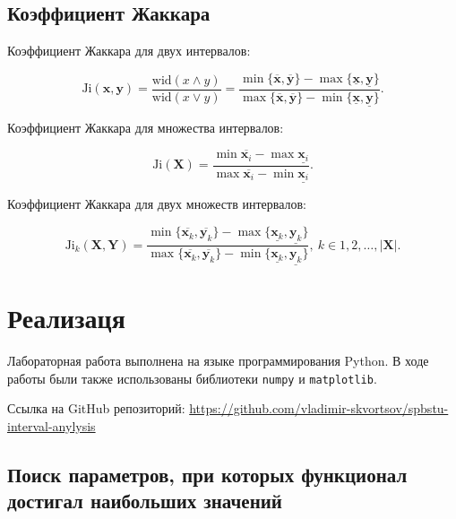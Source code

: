 \documentclass{article}
\begin{document}
  \subsection{Коэффициент Жаккара}

  Коэффициент Жаккара для двух интервалов:

  \begin{equation}
    \text{Ji} (\mathbf{x}, \mathbf{y})
      = \frac{\text{wid} (x \land y)}{\text{wid} (x \lor y)}
      = \frac{\min \{ \overline{\mathbf{x}}, \overline{\mathbf{y}} \} - \max \{ \underline{\mathbf{x}}, \underline{\mathbf{y}} \}}
        {\max\{ \overline{\mathbf{x}}, \overline{\mathbf{y}} \} - \min \{ \underline{\mathbf{x}}, \underline{\mathbf{y}} \}}.
  \end{equation}

  Коэффициент Жаккара для множества интервалов:

  \begin{equation}
    \text{Ji} (\mathbf{X})
      = \frac{\min \overline{\mathbf{x}_i} - \max \underline{\mathbf{x}_i}}
        {\max \overline{\mathbf{x}_i} - \min \underline{\mathbf{x}_i}}.
  \end{equation}

  Коэффициент Жаккара для двух множеств интервалов:

  \begin{equation}
    \text{Ji}_k (\mathbf{X}, \mathbf{Y})
      = \frac{\min \{ \overline{\mathbf{x}_k}, \overline{\mathbf{y}_k} \} - \max \{ \underline{\mathbf{x}_k}, \underline{\mathbf{y}_k} \}}
        {\max\{ \overline{\mathbf{x}_k}, \overline{\mathbf{y}_k} \} - \min \{ \underline{\mathbf{x}_k}, \underline{\mathbf{y}_k} \}},
      \ k \in 1, 2, \dots, |\mathbf{X}|.
  \end{equation}

  \section{Реализаця}

  Лабораторная работа выполнена на языке программирования Python. В ходе
  работы были также использованы библиотеки \verb!numpy! и
  \verb!matplotlib!.

  Ссылка на GitHub репозиторий:
  \href{https://github.com/vladimir-skvortsov/spbstu-interval-anylysis}
  {https://github.com/vladimir-skvortsov/spbstu-interval-anylysis}

  \subsection{Поиск параметров, при которых функционал достигал наибольших
  значений}
\end{document}

